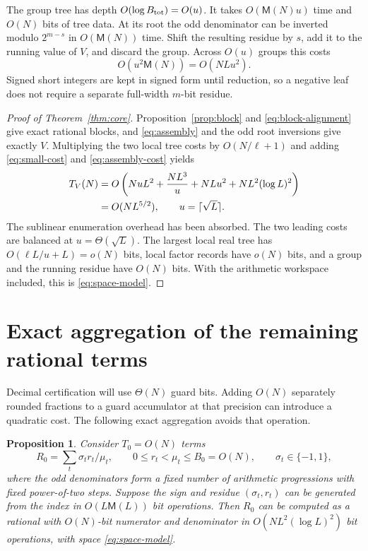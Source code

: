 \documentclass[11pt]{article}
\numberwithin{equation}{section}
\newtheorem{proposition}[theorem]{Proposition}
\theoremstyle{definition}
\newcommand{\M}{\mathsf M}
\begin{document}
The group tree has depth $O(\log B_{\rm tot})=O(u)$.
It takes $O(\M(N)u)$ time and $O(N)$ bits of tree data.
At its root the odd denominator can be inverted modulo
$2^{m-s}$ in $O(\M(N))$ time. Shift the resulting residue
by $s$, add it to the running value of $V$, and discard
the group. Across $O(u)$ groups this costs
\begin{equation}\label{eq:assembly-cost}
 O(u^2\M(N))=O(NLu^2).
\end{equation}
Signed short integers are kept in signed form until reduction,
so a negative leaf does not require a separate full-width
$m$-bit residue.

\begin{proof}[Proof of Theorem~\ref{thm:core}]
Proposition~\ref{prop:block} and \eqref{eq:block-alignment}
give exact rational blocks, and \eqref{eq:assembly} and the
odd root inversions give exactly $V$. Multiplying the two
local tree costs by $O(N/\ell+1)$ and adding
\eqref{eq:small-cost} and \eqref{eq:assembly-cost} yields
\begin{align}\label{eq:total}
 T_V(N)
 &=O\left(NuL^2+\frac{NL^3}{u}
              +NLu^2+NL^2(\log L)^2\right) \notag\\
 &=O(NL^{5/2}),\qquad u=\lceil\sqrt L\rceil.
\end{align}
The sublinear enumeration overhead has been absorbed.
The two leading costs are balanced at $u=\Theta(\sqrt L)$.
The largest local real tree has
$O(\ell L/u+L)=o(N)$ bits, local factor records have
$o(N)$ bits, and a group and the running residue have $O(N)$
bits. With the arithmetic workspace included, this is
\eqref{eq:space-model}.
\end{proof}

\section{Exact aggregation of the remaining rational terms}
\label{sec:word}

Decimal certification will use $\Theta(N)$ guard bits. Adding
$O(N)$ separately rounded fractions to a guard accumulator at
that precision can introduce a quadratic cost. The following
exact aggregation avoids that operation.

\begin{proposition}\label{prop:word}
Consider $T_0=O(N)$ terms
\begin{equation}\label{eq:word-sum}
 R_0=\sum_t\sigma_t r_t/\mu_t,\qquad
 0\le r_t<\mu_t\le B_0=O(N),\qquad \sigma_t\in\{-1,1\},
\end{equation}
where the odd denominators form a fixed number of arithmetic
progressions with fixed power-of-two steps. Suppose the sign
and residue $(\sigma_t,r_t)$ can be generated from the index
in $O(L\M(L))$ bit operations.
Then $R_0$ can be computed as a rational with $O(N)$-bit
numerator and denominator in
$O(NL^2(\log L)^2)$ bit operations, with space
\eqref{eq:space-model}.
\end{proposition}
\end{document}
